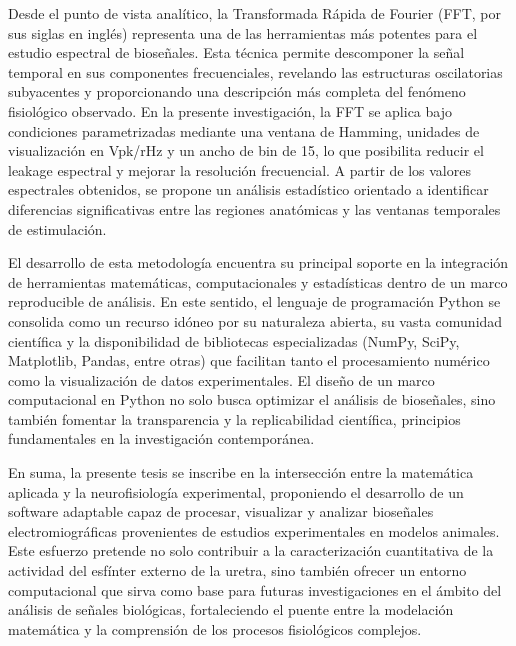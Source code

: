\noindent Desde el punto de vista analítico, la Transformada Rápida de Fourier (FFT, por sus siglas en inglés) representa una de las herramientas más potentes para el estudio espectral de bioseñales. Esta técnica permite descomponer la señal temporal en sus componentes frecuenciales, revelando las estructuras oscilatorias subyacentes y proporcionando una descripción más completa del fenómeno fisiológico observado. En la presente investigación, la FFT se aplica bajo condiciones parametrizadas mediante una ventana de Hamming, unidades de visualización en Vpk/rHz y un ancho de bin de 15, lo que posibilita reducir el leakage espectral y mejorar la resolución frecuencial. A partir de los valores espectrales obtenidos, se propone un análisis estadístico orientado a identificar diferencias significativas entre las regiones anatómicas y las ventanas temporales de estimulación.

\noindent El desarrollo de esta metodología encuentra su principal soporte en la integración de herramientas matemáticas, computacionales y estadísticas dentro de un marco reproducible de análisis. En este sentido, el lenguaje de programación Python se consolida como un recurso idóneo por su naturaleza abierta, su vasta comunidad científica y la disponibilidad de bibliotecas especializadas (NumPy, SciPy, Matplotlib, Pandas, entre otras) que facilitan tanto el procesamiento numérico como la visualización de datos experimentales. El diseño de un marco computacional en Python no solo busca optimizar el análisis de bioseñales, sino también fomentar la transparencia y la replicabilidad científica, principios fundamentales en la investigación contemporánea.

\noindent En suma, la presente tesis se inscribe en la intersección entre la matemática aplicada y la neurofisiología experimental, proponiendo el desarrollo de un software adaptable capaz de procesar, visualizar y analizar bioseñales electromiográficas provenientes de estudios experimentales en modelos animales. Este esfuerzo pretende no solo contribuir a la caracterización cuantitativa de la actividad del esfínter externo de la uretra, sino también ofrecer un entorno computacional que sirva como base para futuras investigaciones en el ámbito del análisis de señales biológicas, fortaleciendo el puente entre la modelación matemática y la comprensión de los procesos fisiológicos complejos.


